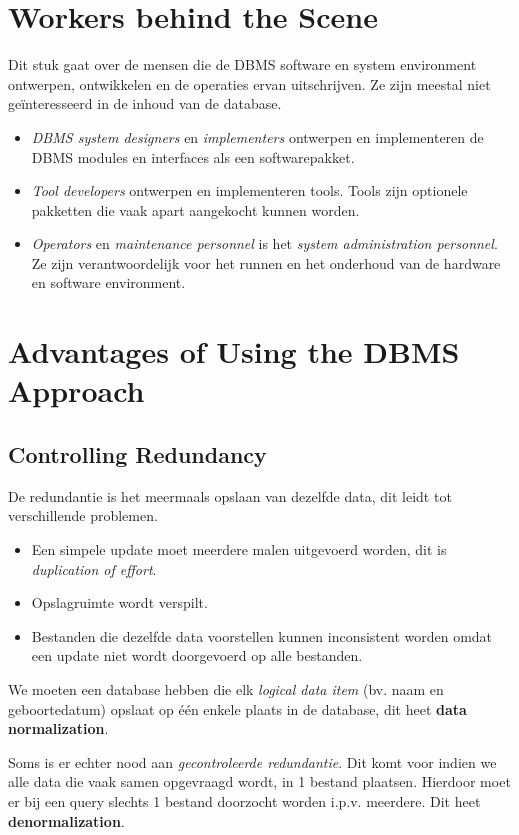 \section{Workers behind the Scene}
Dit stuk gaat over de mensen die de DBMS software en system environment ontwerpen, ontwikkelen en de operaties ervan uitschrijven. Ze zijn meestal niet ge\"interesseerd in de inhoud van de database.
\begin{itemize}
\item \textit{DBMS system designers} en \textit{implementers} ontwerpen en implementeren de DBMS modules en interfaces als een softwarepakket.
\item \textit{Tool developers} ontwerpen en implementeren tools. Tools zijn optionele pakketten die vaak apart aangekocht kunnen worden.
\item \textit{Operators} en \textit{maintenance personnel} is het \textit{system administration personnel}. Ze zijn verantwoordelijk voor het runnen en het onderhoud van de hardware en software environment.
\end{itemize}


\section{Advantages of Using the DBMS Approach}
\subsection{Controlling Redundancy}
De redundantie is het meermaals opslaan van dezelfde data, dit leidt tot verschillende problemen.
\begin{itemize}
\item Een simpele update moet meerdere malen uitgevoerd worden, dit is \textit{duplication of effort}.
\item Opslagruimte wordt verspilt.
\item Bestanden die dezelfde data voorstellen kunnen inconsistent worden omdat een update niet wordt doorgevoerd op alle bestanden.
\end{itemize}
We moeten een database hebben die elk \textit{logical data item} (bv. naam en geboortedatum) opslaat op \'e\'en enkele plaats in de database, dit heet \textbf{data normalization}.

Soms is er echter nood aan \textit{gecontroleerde redundantie}. Dit komt voor indien we alle data die vaak samen opgevraagd wordt, in 1 bestand plaatsen. Hierdoor moet er bij een query slechts 1 bestand doorzocht worden i.p.v. meerdere. Dit heet \textbf{denormalization}.

